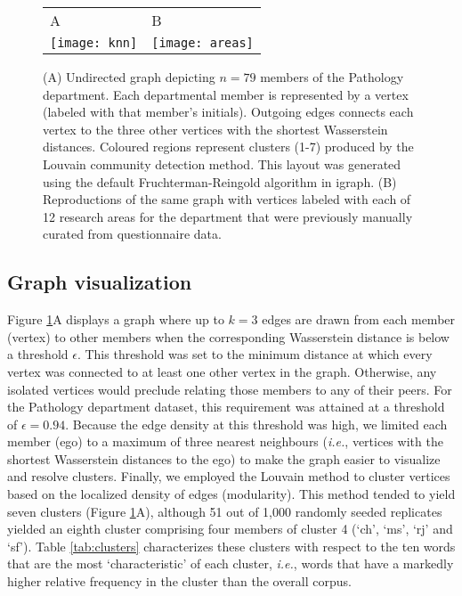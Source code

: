 \documentclass[12pt]{article}
\begin{document}
\begin{figure}[tbp]
\centering
\begin{tabular}{ll}
{\large A} & {\large B}\\[-12pt]
\texttt{[image: knn]} & 
\texttt{[image: areas]}\\
\end{tabular}
\caption{
(A) Undirected graph depicting $n=79$ members of the Pathology department.
Each departmental member is represented by a vertex (labeled with that member's initials). 
Outgoing edges connects each vertex to the three other vertices with the shortest Wasserstein distances.
Coloured regions represent clusters (1-7) produced by the Louvain community detection method.
This layout was generated using the default Fruchterman-Reingold algorithm in igraph.
(B) Reproductions of the same graph with vertices labeled with each of 12 research areas for the department that were previously manually curated from questionnaire data.
}
\label{fig:knn}
\end{figure}


\subsection * {Graph visualization}

Figure \ref{fig:knn}A displays a graph where up to $k=3$ edges are drawn from each member (vertex) to other members when the corresponding Wasserstein distance is below a threshold $\epsilon$.
This threshold was set to the minimum distance at which every vertex was connected to at least one other vertex in the graph.
Otherwise, any isolated vertices would preclude relating those members to  any of their peers.
For the Pathology department dataset, this requirement was attained at a threshold of $\epsilon=0.94$.
Because the edge density at this threshold was high, we limited each member (ego) to a maximum of three nearest neighbours (\textit{i.e.}, vertices with the shortest Wasserstein distances to the ego) to make the graph easier to visualize and resolve clusters.
Finally, we employed the Louvain method to cluster vertices based on the localized density of edges (modularity).
This method tended to yield seven clusters (Figure \ref{fig:knn}A), although 51 out of 1,000 randomly seeded replicates yielded an eighth cluster comprising four members of cluster 4 (`ch', `ms', `rj' and `sf').
Table \ref{tab:clusters} characterizes these clusters with respect to the ten words that are the most `characteristic' of each cluster, \textit{i.e.}, words that have a markedly higher relative frequency in the cluster than the overall corpus.
\end{document}
